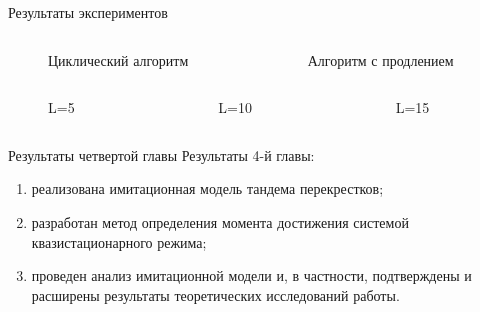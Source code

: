 \documentclass[10pt]{beamer}
\begin{document}
\begin{frame}[allowframebreaks]{Результаты экспериментов}
\begin{columns}
    \begin{column}{0.48\textwidth}
        \begin{figure}[h]
    \centering
    \caption{Циклический алгоритм}
    \label{VK:fig:1}
  \end{figure}
    \end{column}
    \begin{column}{0.48\textwidth}
        \begin{figure}[h]
    \centering
    \caption{Алгоритм с продлением}
    \label{VK:fig:1}
  \end{figure}
    \end{column}
\end{columns}
\framebreak

\begin{columns}
    \begin{column}{0.33\textwidth}
        \begin{figure}[h]
    \centering
    \caption{L=5}
    \label{VK:fig:1}
  \end{figure}
    \end{column}
    \begin{column}{0.33\textwidth}
        \begin{figure}[h]
    \centering
    \caption{L=10}
    \label{VK:fig:1}
  \end{figure}
    \end{column}
        \begin{column}{0.33\textwidth}
        \begin{figure}[h]
    \centering
    \caption{L=15}
    \label{VK:fig:1}
  \end{figure}
    \end{column}
\end{columns}


\end{frame}



\begin{frame}{Результаты четвертой главы}
Результаты 4-й главы:
\begin{enumerate}
    \item реализована имитационная модель тандема перекрестков;
    \item разработан метод определения момента достижения системой квазистационарного режима;
    \item проведен анализ имитационной модели и, в частности, подтверждены и расширены результаты теоретических исследований работы.
\end{enumerate}

\end{frame}
\end{document}
